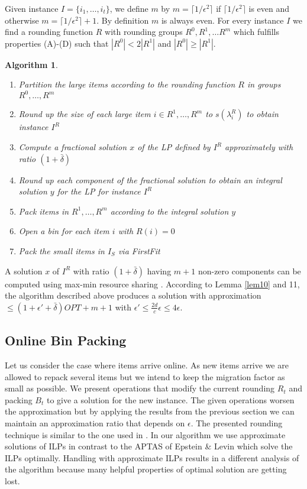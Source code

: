 \documentclass[a4paper,11pt]{article}
\newtheorem{algo}{Algorithm}
\begin{document}
Given instance $I = \{i_1, \ldots ,i_t \}$, we define $m$ by $m = \lceil 1/\epsilon^2 \rceil$ if 
$\lceil 1/\epsilon^2 \rceil$ is even and otherwise $m = \lceil 1/\epsilon^2 \rceil +1$. By definition $m$ is
always even.
For every instance $I$ we find a rounding function $R$
with rounding groups $R^0, R^1, \ldots R^m$ which fulfills properties (A)-(D) such that $|R^0| < 2|R^1|$
and $|R^0| \geq |R^1|$.
\begin{algo}\label{alg6}
\   
\begin{enumerate}
\item Partition the large items according to the rounding function $R$ in groups $R^0, \ldots, R^m$
\item Round up the size of each large item $i \in R^1, \ldots ,R^m$ to $s(\lambda_{i}^R)$ to obtain instance $I^R$
\item Compute a fractional solution $x$ of the LP defined by $I^R$ approximately with ratio $(1+\bar{\delta})$
\item Round up each component of the fractional solution to obtain an integral solution $y$ for the LP for instance $I^R$
\item Pack items in $R^1, \ldots ,R^m$ according to the integral solution $y$
\item Open a bin for each item $i$ with $R(i)=0$
\item Pack the small items in $I_{S}$ via FirstFit
\end{enumerate}
\end{algo}
A solution $x$ of $I^R$ with ratio $(1+\bar{\delta})$ having $m+1$ non-zero components can be computed using
max-min resource sharing \cite{grigoriadis2001approximate}.
According to Lemma \ref{lem10} and 11, the algorithm described above produces a solution with approximation
$\leq (1+ \epsilon' + \bar{\delta})\mathit{OPT}+m+1$ with $\epsilon' \leq \frac{2d}{c} \epsilon
\leq 4 \epsilon$.
\subsection{Online Bin Packing}
Let us consider the case where items arrive online. As new items arrive we are allowed to repack several items but
we intend to keep the migration factor as small as possible.
We present operations that modify the current rounding $R_t$ and packing $B_t$ to give a solution for
the new instance. The given operations worsen the approximation but by applying the results from the previous section
we can maintain an approximation ratio that depends on $\epsilon$.
The presented rounding technique is similar to the one used in \cite{epstein2006robust}. 
In our algorithm we use approximate solutions of ILPs in contrast to the APTAS of Epstein \& Levin which solve
the ILPs optimally. Handling with approximate ILPs results in a different analysis of the algorithm because
many helpful properties of optimal solution are getting lost.
\end{document}
